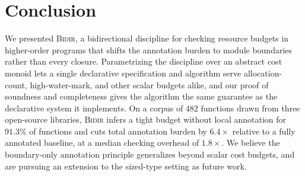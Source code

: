 \section{Conclusion}
\label{sec:conclusion}

We presented \textsc{Bidir}, a bidirectional discipline for checking
resource budgets in higher-order programs that shifts the annotation
burden to module boundaries rather than every closure. Parametrizing the
discipline over an abstract cost monoid lets a single declarative
specification and algorithm serve allocation-count, high-water-mark, and
other scalar budgets alike, and our proof of soundness and completeness
gives the algorithm the same guarantee as the declarative system it
implements. On a corpus of $482$ functions drawn from three open-source
libraries, \textsc{Bidir} infers a tight budget without local annotation
for $91.3\%$ of functions and cuts total annotation burden by
$6.4\times$ relative to a fully annotated baseline, at a median checking
overhead of $1.8\times$. We believe the boundary-only annotation
principle generalizes beyond scalar cost budgets, and are pursuing an
extension to the sized-type setting as future work.
